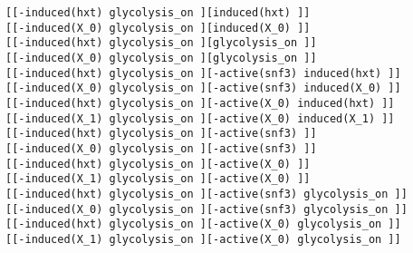 \begin{lstlisting}
[[-induced(hxt) glycolysis_on ][induced(hxt) ]]
[[-induced(X_0) glycolysis_on ][induced(X_0) ]]
[[-induced(hxt) glycolysis_on ][glycolysis_on ]]
[[-induced(X_0) glycolysis_on ][glycolysis_on ]]
[[-induced(hxt) glycolysis_on ][-active(snf3) induced(hxt) ]]
[[-induced(X_0) glycolysis_on ][-active(snf3) induced(X_0) ]]
[[-induced(hxt) glycolysis_on ][-active(X_0) induced(hxt) ]]
[[-induced(X_1) glycolysis_on ][-active(X_0) induced(X_1) ]]
[[-induced(hxt) glycolysis_on ][-active(snf3) ]]
[[-induced(X_0) glycolysis_on ][-active(snf3) ]]
[[-induced(hxt) glycolysis_on ][-active(X_0) ]]
[[-induced(X_1) glycolysis_on ][-active(X_0) ]]
[[-induced(hxt) glycolysis_on ][-active(snf3) glycolysis_on ]]
[[-induced(X_0) glycolysis_on ][-active(snf3) glycolysis_on ]]
[[-induced(hxt) glycolysis_on ][-active(X_0) glycolysis_on ]]
[[-induced(X_1) glycolysis_on ][-active(X_0) glycolysis_on ]]
\end{lstlisting}
